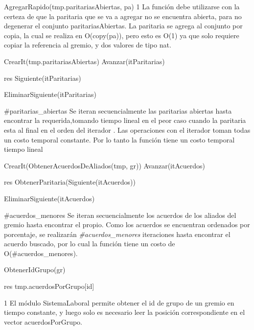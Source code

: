 {
	\state AgregarRapido(tmp.paritariasAbiertas, pa)		
}
{1}
{ La funci\'on debe utilizarse con la certeza de que la paritaria que se va a agregar no se encuentra abierta, para no degenerar el conjunto paritariasAbiertas. La paritaria se agrega al conjunto por copia, la cual se realiza en O(copy(pa)), pero esto es O(1) ya que solo requiere copiar la referencia al gremio, y dos valores de tipo nat. }

{
	\state {} \asig CrearIt(tmp.paritariasAbiertas)		
			
		\state
		\state Avanzar(itParitarias)								
	\endwhile
	\state

	\state res \asig Siguiente(itParitarias)						

	\state EliminarSiguiente(itParitarias)							
}
{\#paritarias\_abiertas}
{Se iteran secuencialmente las paritarias abiertas hasta encontrar la requerida,tomando tiempo lineal en el peor caso cuando la paritaria esta al final en el orden del iterador
. Las operaciones con el iterador toman todas un costo temporal constante. Por lo tanto la funci\'on tiene un costo temporal tiempo lineal
}

{
	\state {} \asig CrearIt(ObtenerAcuerdosDeAliados(tmp, gr))		
			
		\state
		\state Avanzar(itAcuerdos)  								
	\endwhile
	\state

	\state res \asig ObtenerParitaria(Siguiente(itAcuerdos))		

	\state EliminarSiguiente(itAcuerdos)							
}
{\#acuerdos\_menores}
{Se iteran secuencialmente los acuerdos de los aliados del gremio hasta encontrar el propio. Como los acuerdos se encuentran ordenados por porcentaje, se realizar\'an \emph{\#acuerdos\_menores} iteraciones hasta encontrar el acuerdo buscado, por lo cual la funci\'on tiene un costo de O(\#acuerdos\_menores). }

{
	\state {} \asig ObtenerIdGrupo(gr)		

	\state res \asig tmp.acuerdosPorGrupo[id]							
}
{1}
{ El m\'odulo SistemaLaboral permite obtener el id de grupo de un gremio en tiempo constante, y luego solo es necesario leer la posici\'on correspondiente en el vector acuerdosPorGrupo. }


